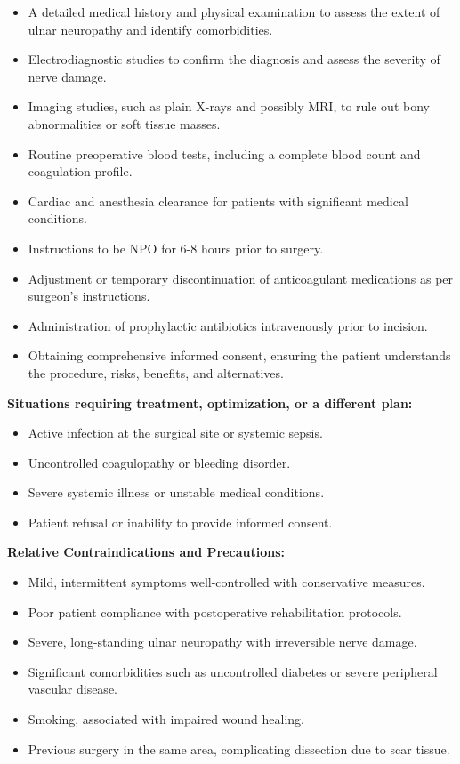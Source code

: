 \begin{itemize}
  \item A detailed medical history and physical examination to assess the extent of ulnar neuropathy and identify comorbidities.
  \item Electrodiagnostic studies to confirm the diagnosis and assess the severity of nerve damage.
  \item Imaging studies, such as plain X-rays and possibly MRI, to rule out bony abnormalities or soft tissue masses.
  \item Routine preoperative blood tests, including a complete blood count and coagulation profile.
  \item Cardiac and anesthesia clearance for patients with significant medical conditions.
  \item Instructions to be NPO for 6-8 hours prior to surgery.
  \item Adjustment or temporary discontinuation of anticoagulant medications as per surgeon's instructions.
  \item Administration of prophylactic antibiotics intravenously prior to incision.
  \item Obtaining comprehensive informed consent, ensuring the patient understands the procedure, risks, benefits, and alternatives.
\end{itemize}

\textbf{Situations requiring treatment, optimization, or a different plan:}
\begin{itemize}
  \item Active infection at the surgical site or systemic sepsis.
  \item Uncontrolled coagulopathy or bleeding disorder.
  \item Severe systemic illness or unstable medical conditions.
  \item Patient refusal or inability to provide informed consent.
\end{itemize}

\textbf{Relative Contraindications and Precautions:}
\begin{itemize}
  \item Mild, intermittent symptoms well-controlled with conservative measures.
  \item Poor patient compliance with postoperative rehabilitation protocols.
  \item Severe, long-standing ulnar neuropathy with irreversible nerve damage.
  \item Significant comorbidities such as uncontrolled diabetes or severe peripheral vascular disease.
  \item Smoking, associated with impaired wound healing.
  \item Previous surgery in the same area, complicating dissection due to scar tissue.
\end{itemize}

